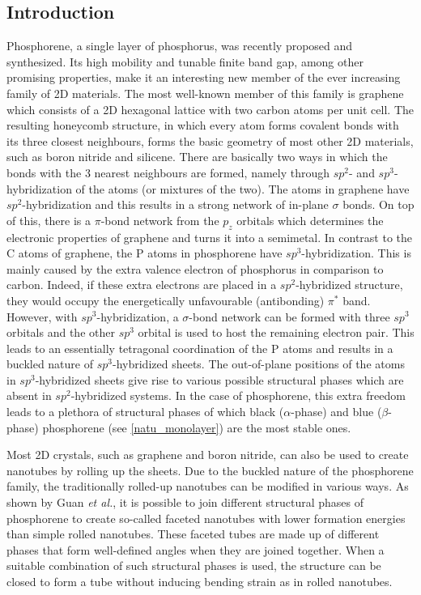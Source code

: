 \subsection{Introduction}

Phosphorene, a single layer of phosphorus, was recently proposed and synthesized\cite{Li2014,Liu2014a,Koenig2014,Lu2014}. Its high mobility and tunable finite band gap, among other promising properties\cite{Jain2015,Wei2014,Kou2014,Tahir2015,zhou2014}, make it an interesting new member of the ever increasing family of 2D materials. The most well-known member of this family is graphene which consists of a 2D hexagonal lattice with two carbon atoms per unit cell. The resulting honeycomb structure, in which every atom forms covalent bonds with its three closest neighbours, forms the basic geometry of most other 2D materials, such as boron nitride and silicene. There are basically two ways in which the bonds with the 3 nearest neighbours are formed, namely through  $sp^2$- and $sp^3$-hybridization of the atoms (or mixtures of the two). The atoms in graphene have $sp^2$-hybridization and this results in a strong network of in-plane $\sigma$ bonds. On top of this, there is a $\pi$-bond network from the $p_z$ orbitals which determines the electronic properties of graphene and turns it into a semimetal. In contrast to the C atoms of graphene, the P atoms in phosphorene have $sp^3$-hybridization. This is mainly caused by the extra valence electron of phosphorus in comparison to carbon. Indeed, if these extra electrons are placed in a $sp^2$-hybridized structure, they would occupy the energetically unfavourable (antibonding) $\pi^*$ band. However, with $sp^3$-hybridization, a $\sigma$-bond network can be formed with three $sp^3$ orbitals and the other $sp^3$ orbital is used to host the remaining electron pair. This leads to an essentially tetragonal coordination of the P atoms and results in a buckled nature of $sp^3$-hybridized sheets. The out-of-plane positions of the atoms in $sp^3$-hybridized sheets give rise to various possible structural phases which are absent in $sp^2$-hybridized systems. In the case of phosphorene, this extra freedom leads to a plethora of structural phases\cite{Guan2014a,Wu2015} of which black ($\alpha$-phase) and blue ($\beta$-phase) phosphorene (see \autoref{natu_monolayer}) are the most stable ones.  

Most 2D crystals, such as graphene and boron nitride, can also be used to create nanotubes by rolling up the sheets. Due to the buckled nature of the phosphorene family, the traditionally rolled-up nanotubes can be modified in various ways. As shown by Guan \textit{et al.}\cite{Guan2014a}, it is possible to join different structural phases of phosphorene to create so-called faceted nanotubes with lower formation energies than simple rolled nanotubes. These faceted tubes are made up of different phases that form well-defined angles when they are joined together.  When a suitable combination of such structural phases is used, the structure can be closed to form a tube without inducing bending strain as in rolled nanotubes.

